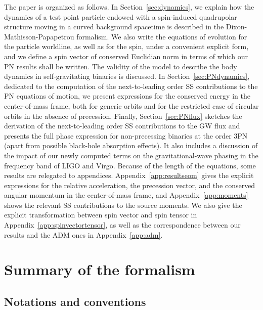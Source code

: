 \documentclass[
superscriptaddress,
preprint,
prd,tightenlines,showpacs,nofootinbib,
eqsecnum,
amsfonts,amsmath,amssymb]{revtex4-1}
\begin{document}
The paper is organized as follows. In Section~\ref{sec:dynamics}, we explain
how the dynamics of a test point particle endowed with a spin-induced
quadrupolar structure moving in a curved background spacetime is described in
the Dixon-Mathisson-Papapetrou formalism. We also write the equations of
evolution for the particle worldline, as well as for the spin, under a
convenient explicit form, and we define a spin vector of conserved Euclidian
norm in terms of which our PN results shall be written. The validity of the
model to describe the body dynamics in self-gravitating binaries is discussed.
In Section~\ref{sec:PNdynamics}, dedicated to the computation of the
next-to-leading order SS contributions to the PN equations of motion, we
present expressions for the conserved energy in the center-of-mass frame, both
for generic orbits and for the restricted case of circular orbits in the
absence of precession. Finally, Section~\ref{sec:PNflux} sketches the
derivation of the next-to-leading order SS contributions to the GW flux and
presents the full phase expression for non-precessing binaries at the order
3PN (apart from possible black-hole absorption effects). It also includes a
discussion of the impact of our newly computed terms on the gravitational-wave
phasing in the frequency band of LIGO and Virgo. Because of the length of the
equations, some results are relegated to appendices.
Appendix~\ref{app:resultseom} gives the explicit expressions for the relative
acceleration, the precession vector, and the conserved angular momentum in the
center-of-mass frame, and Appendix~\ref{app:moments} shows the relevant SS
contributions to the source moments. We also give the explicit transformation
between spin vector and spin tensor in Appendix~\ref{app:spinvectortensor}, as
well as the correspondence between our results and the ADM ones in
Appendix~\ref{app:adm}.



\section{Summary of the formalism}\label{sec:summaryformalism}


\subsection{Notations and conventions}
\label{subsec:notations}
\end{document}
